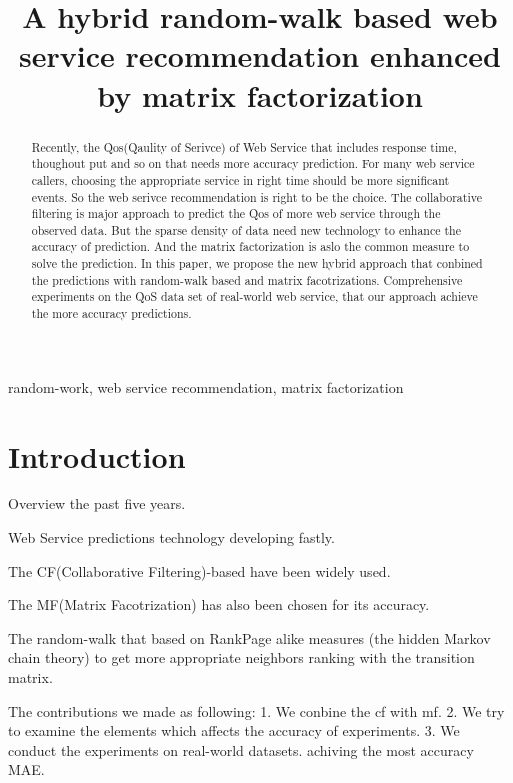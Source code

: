 \documentclass[conference]{IEEEtran}
\begin{document}
\title{A hybrid random-walk based web service recommendation enhanced by matrix factorization}

\author{
  \and
}

\maketitle

\begin{abstract}
Recently, the Qos(Qaulity of Serivce) of Web Service that includes response time, thoughout put and so on that needs more accuracy prediction. For many web service  callers, choosing the appropriate service in right time should be more significant events. So the web serivce recommendation is right to be the choice. The collaborative filtering is major approach to predict the Qos of more web service through the observed data. But the sparse density of data need new technology to enhance the accuracy of prediction. And the matrix factorization is aslo the common measure to solve the prediction. In this paper, we propose the new hybrid approach that conbined the predictions with random-walk based and matrix facotrizations. Comprehensive experiments on the QoS data set of real-world web service, that our approach achieve the more accuracy predictions.
\end{abstract}

\begin{IEEEkeywords}
  random-work, web service recommendation, matrix factorization
\end{IEEEkeywords}

\IEEEpeerreviewmaketitle


\section{Introduction}
Overview the past five years.
\par Web Service predictions technology developing fastly.
\par The CF(Collaborative Filtering)-based have been widely used.
\par The MF(Matrix Facotrization) has also been chosen for its accuracy.
\par The random-walk that based on RankPage alike measures (the hidden Markov chain theory) to get more appropriate neighbors ranking with the transition matrix.
\par The contributions we made as following:
1. We conbine the cf with mf.
2. We try to examine the elements which affects the accuracy of experiments.
3. We conduct the experiments on real-world datasets. achiving the most accuracy MAE.
\end{document}
